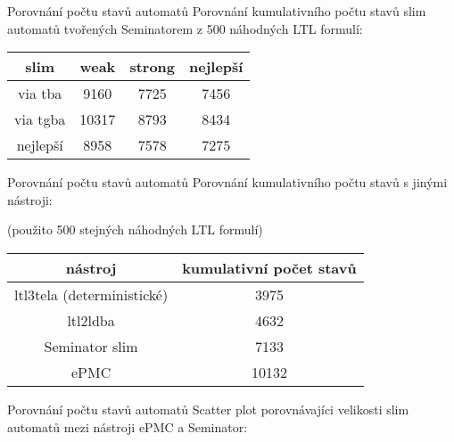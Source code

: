 \documentclass[
]{beamer}
\newcommand{\hlineny}{\hline}
\begin{document}
	\begin{frame}{Porovnání počtu stavů automatů}
		Porovnání kumulativního počtu stavů slim automatů tvořených Seminatorem z 500 náhodných LTL formulí:
		\begin{table}[ht]
			\centering
			
			
			
	\begin{tabular}{ |c||c|c|c| } 		
		\hline
		
		slim&weak&\alert{strong}&nejlepší \\
		\hline
		\hline
		\alert{via tba}&9160& \alert{7725} & 7456\\
		\hline
		via tgba&10317& 8793& 8434\\ 
		\hline
		nejlepší&8958& 7578& \alert{7275} \\ 
		\hline
	\end{tabular}
\end{table}
\end{frame}

	\begin{frame}{Porovnání počtu stavů automatů}
		Porovnání kumulativního počtu stavů s jinými nástroji:
		
		(použito 500 stejných náhodných LTL formulí)
		\begin{table}[ht]
			\centering
			
		
		
		\begin{tabular}{|c||c|}
			\hline
			nástroj  &   kumulativní počet stavů \\
			\hline
			\hline
			
			ltl3tela (deterministické)&  	3975\\\hlineny
			ltl2ldba      &        4632 \\\hlineny
			\alert{Seminator slim}         &        \alert{7133} \\\hline
			ePMC     &     10132 \\\hline
			
			
			
		\end{tabular}
\end{table}
	\end{frame}
	\begin{frame}{Porovnání počtu stavů automatů}
		Scatter plot porovnávajíci velikosti slim automatů mezi nástroji ePMC a Seminator:
		\begin{figure}[ht]
			\centering
			\label{scatter:slim-epmc}
			\begin{tikzpicture}
				
			\end{tikzpicture}
		\end{figure}
	\end{frame}
	
\end{document}
